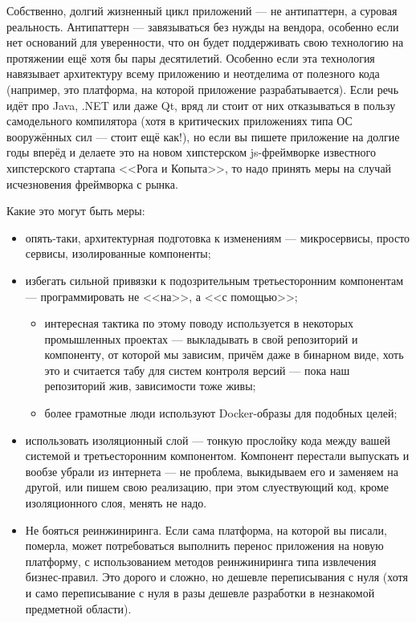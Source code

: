 \documentclass{../../text-style}
\begin{document}
Собственно, долгий жизненный цикл приложений --- не антипаттерн, а суровая реальность. Антипаттерн --- завязываться без нужды на вендора, особенно если нет оснований для уверенности, что он будет поддерживать свою технологию на протяжении ещё хотя бы пары десятилетий. Особенно если эта технология навязывает архитектуру всему приложению и неотделима от полезного кода (например, это платформа, на которой приложение разрабатывается). Если речь идёт про Java, .NET или даже Qt, вряд ли стоит от них отказываться в пользу самодельного компилятора (хотя в критических приложениях типа ОС вооружённых сил --- стоит ещё как!), но если вы пишете приложение на долгие годы вперёд и делаете это на новом хипстерском js-фреймворке известного хипстерского стартапа <<Рога и Копыта>>, то надо принять меры на случай исчезновения фреймворка с рынка.

Какие это могут быть меры:

\begin{itemize}
    \item опять-таки, архитектурная подготовка к изменениям --- микросервисы, просто сервисы, изолированные компоненты;
    \item избегать сильной привязки к подозрительным третьесторонним компонентам --- программировать не <<на>>, а <<с помощью>>;
    \begin{itemize}
        \item интересная тактика по этому поводу используется в некоторых промышленных проектах --- выкладывать в свой репозиторий и компоненту, от которой мы зависим, причём даже в бинарном виде, хоть это и считается табу для систем контроля версий --- пока наш репозиторий жив, зависимости тоже живы; 
        \item более грамотные люди используют Docker-образы для подобных целей;
    \end{itemize}
    \item использовать изоляционный слой --- тонкую прослойку кода между вашей системой и третьесторонним компонентом. Компонент перестали выпускать и вообзе убрали из интернета --- не проблема, выкидываем его и заменяем на другой, или пишем свою реализацию, при этом слуествующий код, кроме изоляционного слоя, менять не надо.
    \item Не бояться реинжиниринга. Если сама платформа, на которой вы писали, померла, может потребоваться выполнить перенос приложения на новую платформу, с использованием методов реинжиниринга типа извлечения бизнес-правил. Это дорого и сложно, но дешевле переписывания с нуля (хотя и само переписывание с нуля в разы дешевле разработки в незнакомой предметной области).
\end{itemize}
\end{document}
